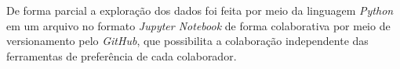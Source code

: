 De forma parcial a exploração dos dados foi feita por meio da linguagem \textit{Python} em um arquivo no formato \textit{Jupyter Notebook} de forma colaborativa por meio de versionamento pelo \textit{GitHub}, que possibilita a colaboração independente das ferramentas de preferência de cada colaborador.

